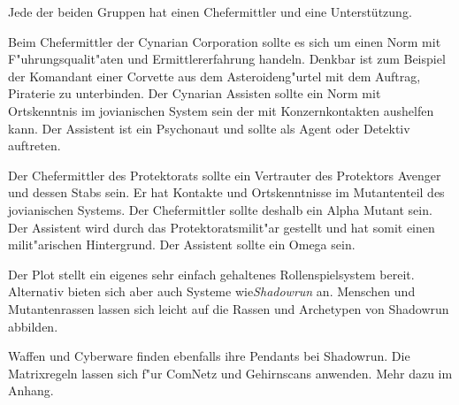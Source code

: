 Jede der beiden Gruppen hat einen Chefermittler und eine Unterstützung.

Beim Chefermittler der Cynarian Corporation sollte es sich um einen Norm  mit F"uhrungsqualit"aten und Ermittlererfahrung handeln. Denkbar ist zum Beispiel der Komandant einer Corvette aus dem Asteroideng"urtel mit dem Auftrag, Piraterie zu unterbinden. Der Cynarian Assisten sollte ein Norm mit Ortskenntnis im jovianischen System sein der mit Konzernkontakten aushelfen kann. Der Assistent ist ein Psychonaut und sollte als Agent oder Detektiv auftreten.

Der Chefermittler des Protektorats sollte ein Vertrauter des Protektors Avenger und dessen Stabs sein. Er hat Kontakte und Ortskenntnisse im Mutantenteil des jovianischen Systems. Der Chefermittler sollte deshalb ein Alpha Mutant sein. Der Assistent wird durch das Protektoratsmilit"ar gestellt und hat somit einen milit"arischen Hintergrund. Der Assistent sollte ein Omega sein.


Der Plot stellt ein eigenes sehr einfach gehaltenes Rollenspielsystem bereit. Alternativ bieten sich aber auch Systeme wie\emph{Shadowrun} an. Menschen und Mutantenrassen lassen sich leicht auf die Rassen und Archetypen von Shadowrun abbilden. 

Waffen und Cyberware finden ebenfalls ihre Pendants bei Shadowrun. Die Matrixregeln lassen sich f"ur ComNetz und Gehirnscans anwenden. Mehr dazu im Anhang.